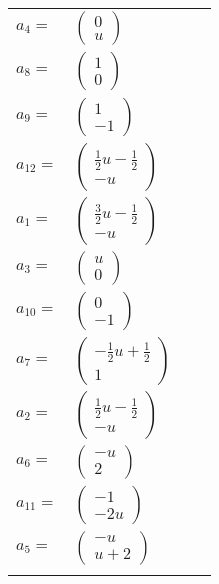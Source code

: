 \documentclass[1p]{elsarticle_modified}
\theoremstyle{definition}
\begin{document}
\begin{tabular}{m{7pt} m{180pt} m{7pt} m{180pt} }
\flushright $a_{4}=$&$\begin{pmatrix}0\\u\end{pmatrix}$ \\
\flushright $a_{8}=$&$\begin{pmatrix}1\\0\end{pmatrix}$ \\
\flushright $a_{9}=$&$\begin{pmatrix}1\\-1\end{pmatrix}$ \\
\flushright $a_{12}=$&$\begin{pmatrix}\frac{1}{2} u-\frac{1}{2}\\- u\end{pmatrix}$ \\
\flushright $a_{1}=$&$\begin{pmatrix}\frac{3}{2} u-\frac{1}{2}\\- u\end{pmatrix}$ \\
\flushright $a_{3}=$&$\begin{pmatrix}u\\0\end{pmatrix}$ \\
\flushright $a_{10}=$&$\begin{pmatrix}0\\-1\end{pmatrix}$ \\
\flushright $a_{7}=$&$\begin{pmatrix}-\frac{1}{2} u+\frac{1}{2}\\1\end{pmatrix}$ \\
\flushright $a_{2}=$&$\begin{pmatrix}\frac{1}{2} u-\frac{1}{2}\\- u\end{pmatrix}$ \\
\flushright $a_{6}=$&$\begin{pmatrix}- u\\2\end{pmatrix}$ \\
\flushright $a_{11}=$&$\begin{pmatrix}-1\\-2 u\end{pmatrix}$ \\
\flushright $a_{5}=$&$\begin{pmatrix}- u\\u+2\end{pmatrix}$\\&\end{tabular}
\end{document}
